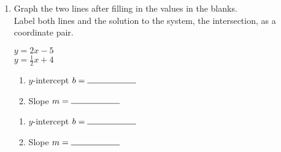 \documentclass[12pt, twoside]{article}
\begin{document}
\begin{enumerate}
\begin{multicols}{2}
          Line: \hspace{1cm} Solid ($=$) \hspace{0.45cm} Dashed ($\neq$)\\[0.5cm]
          Shading: \hspace{0.3cm} Above ($y>$) \hspace{0.25cm} Below ($y<$)
        \end{multicols}

    \newpage
    \item Graph the two lines after filling in the values in the blanks.\\[0.5cm]
    Label both lines and the solution to the system, the intersection, as a coordinate pair.\\

    \begin{multicols}{2}
      $y=2 x -5$ \\
      $y=\frac{1}{2} x +4$
    \end{multicols}
    \begin{multicols}{2}
      \raggedcolumns
      \begin{enumerate}
        \item $y$-intercept $b= \rule{2cm}{0.15mm}$ \\[0.5cm]
        \item Slope \hspace{0.7cm} $m= \rule{2cm}{0.15mm}$\\[0.5cm]
      \end{enumerate}
      \begin{enumerate}
        \item $y$-intercept $b= \rule{2cm}{0.15mm}$ \\[0.5cm]
        \item Slope \hspace{0.7cm} $m= \rule{2cm}{0.15mm}$\\[0.5cm]
      \end{enumerate}
    \end{multicols}

    \begin{center} %
    \end{center}


\end{enumerate}
\end{document}
